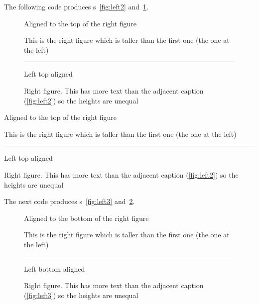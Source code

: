     The following code produces \figurerefname s~\ref{fig:left2} 
and~\ref{fig:right2}.
\begin{lcode}
\begin{figure}
\hhrule \vspace{0.5\onelineskip}
\null\hfill\parbox[t]{0.45\linewidth}{%
  \centering
  Aligned to the top of the right figure
}\hfill
\parbox[t]{0.45\linewidth}{%
  \centering
   This is the right figure which is taller
   than the first one (the one at the left)
}\hfill\null
\vspace{0.5\onelineskip}\hrule
\null\hfill\parbox[t]{0.4\linewidth}{%
  \caption{Left top aligned}\label{fig:left2}%
}\hfill
\parbox[t]{0.4\linewidth}{%
  \caption{Right figure. This has more text than the adjacent
           caption (\ref{fig:left2}) so the heights are unequal}%
           \label{fig:right2}%
}\hfill\null
\hhrule
\end{figure}
\end{lcode}

\begin{shadefigure}
\hhrule \vspace{0.5\onelineskip}
\null\hfill\parbox[t]{0.45\linewidth}{%
  \centering
  Aligned to the top of the right figure
}\hfill
\parbox[t]{0.45\linewidth}{%
  \centering
   This is the right figure which is taller
   than the first one (the one at the left)
}\hfill\null
\vspace{0.5\onelineskip}\hrule
\null\hfill\parbox[t]{0.4\linewidth}{%
  \caption{Left top aligned}\label{fig:left2}%
}\hfill
\parbox[t]{0.4\linewidth}{%
  \caption{Right figure. This has more text than the adjacent
           caption (\ref{fig:left2}) so the heights are unequal}%
           \label{fig:right2}%
}\hfill\null
\hhrule
\end{shadefigure}

    The next code produces \figurerefname s~\ref{fig:left3} 
and~\ref{fig:right3}.
\begin{lcode}
\begin{figure}
\hhrule \vspace{0.5\onelineskip}
\null\hfill\parbox[b]{0.45\linewidth}{%
  \centering
  Aligned to the bottom of the right figure
}\hfill
\parbox[b]{0.45\linewidth}{%
  \centering
   This is the right figure which is taller
   than the first one (the one at the left)
}\hfill\null
\vspace{0.5\onelineskip}\hrule
\null\hfill\parbox[t]{0.4\linewidth}{%
  \caption{Left bottom aligned}\label{fig:left3}%
}\hfill
\parbox[t]{0.4\linewidth}{%
  \caption{Right figure. This has more text than the adjacent
           caption (\ref{fig:left3}) so the heights are unequal}%
           \label{fig:right3}%
}\hfill\null
\hhrule
\end{figure}
\end{lcode}

